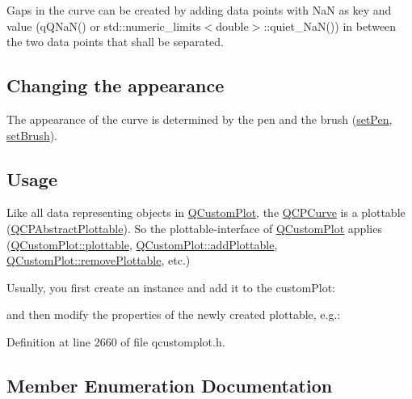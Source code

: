 Gaps in the curve can be created by adding data points with Na\+N as key and value ({\ttfamily q\+Q\+Na\+N()} or {\ttfamily std\+::numeric\+\_\+limits$<$double$>$\+::quiet\+\_\+\+Na\+N()}) in between the two data points that shall be separated.\hypertarget{class_q_c_p_statistical_box_appearance}{}\subsection{Changing the appearance}\label{class_q_c_p_statistical_box_appearance}
The appearance of the curve is determined by the pen and the brush (\hyperlink{class_q_c_p_abstract_plottable_ab74b09ae4c0e7e13142fe4b5bf46cac7}{set\+Pen}, \hyperlink{class_q_c_p_abstract_plottable_a7a4b92144dca6453a1f0f210e27edc74}{set\+Brush}). \hypertarget{class_q_c_p_statistical_box_usage}{}\subsection{Usage}\label{class_q_c_p_statistical_box_usage}
Like all data representing objects in \hyperlink{class_q_custom_plot}{Q\+Custom\+Plot}, the \hyperlink{class_q_c_p_curve}{Q\+C\+P\+Curve} is a plottable (\hyperlink{class_q_c_p_abstract_plottable}{Q\+C\+P\+Abstract\+Plottable}). So the plottable-\/interface of \hyperlink{class_q_custom_plot}{Q\+Custom\+Plot} applies (\hyperlink{class_q_custom_plot_a32de81ff53e263e785b83b52ecd99d6f}{Q\+Custom\+Plot\+::plottable}, \hyperlink{class_q_custom_plot_ab7ad9174f701f9c6f64e378df77927a6}{Q\+Custom\+Plot\+::add\+Plottable}, \hyperlink{class_q_custom_plot_af3dafd56884208474f311d6226513ab2}{Q\+Custom\+Plot\+::remove\+Plottable}, etc.)

Usually, you first create an instance and add it to the custom\+Plot\+: 
\begin{DoxyCodeInclude}
\end{DoxyCodeInclude}
and then modify the properties of the newly created plottable, e.\+g.\+: 
\begin{DoxyCodeInclude}
\end{DoxyCodeInclude}


Definition at line 2660 of file qcustomplot.\+h.



\subsection{Member Enumeration Documentation}
\hypertarget{class_q_c_p_curve_a2710e9f79302152cff794c6e16cc01f1}{}
